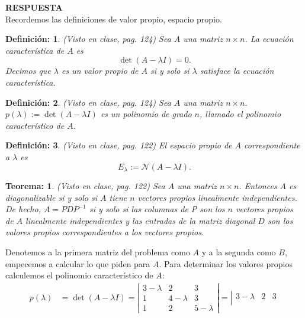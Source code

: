 \documentclass[11pt,letterpaper]{article}
\newcommand{\mcN}{\mathcal{N}}
\newcommand{\res}{\textbf{RESPUESTA}\\}
\newtheorem{thmt}{Teorema:}
\newtheorem{thmd}{Definición:}
\begin{document}
\begin{enumerate}
\res Recordemos las definiciones de valor propio, espacio propio.
\begin{framed}
    \begin{thmd} \label{d_valor_propio}
	(Visto en clase, pag. 124) Sea $A$ una matriz $n\times n$. La ecuación característica de $A$ es
	$$\det(A-\lambda I)=0.$$
	Decimos que $\lambda$ es un valor propio de $A$ si y solo si $\lambda$ satisface la ecuación característica. 
    \end{thmd}
\end{framed}
\begin{framed}
    \begin{thmd} \label{d_polinomio_car}
	(Visto en clase, pag. 124) Sea $A$ una matriz $n\times n$. $p(\lambda):=\det(A- \lambda I)$ es un polinomio de grado $n$, llamado el polinomio característico de $A$. 
    \end{thmd}
\end{framed}
\begin{framed}
    \begin{thmd} \label{d_espacio_propio}
	(Visto en clase, pag. 122) El espacio propio de $A$ correspondiente a $\lambda$ es 
	$$E_\lambda:=\mcN(A-\lambda I).$$ 
    \end{thmd}
\end{framed}
\begin{framed}
    \begin{thmt} \label{t_matriz_diagonalizable}
	(Visto en clase, pag. 122) Sea $A$ una matriz $n \times n$. Entonces $A$ es diagonalizable si y solo si $A$ tiene $n$ vectores propios linealmente independientes. De hecho, $A= PDP^{-1}$ si y solo si las columnas de P son los $n$ vectores
propios de $A$ linealmente independientes y las entradas de la matriz diagonal $D$ son los valores propios correspondientes a los vectores propios.
    \end{thmt}
\end{framed}
Denotemos a la primera matriz del problema como $A$ y a la segunda como $B$, empecemos a calcular lo que piden para $A$.
Para determinar los valores propios calculemos el polinomio característico de $A$:
\begin{align*}
p(\lambda) &= \det (A-\lambda I)=\left|\begin{array}{ccc}
3-\lambda & 2 & 3 \\
1& 4-\lambda & 3\\
1 & 2 & 5-\lambda
\end{array} \right|=\left|\begin{array}{ccc}
3-\lambda & 2 & 3 \\

\end{array}
\end{align*}
\end{enumerate}
\end{document}
